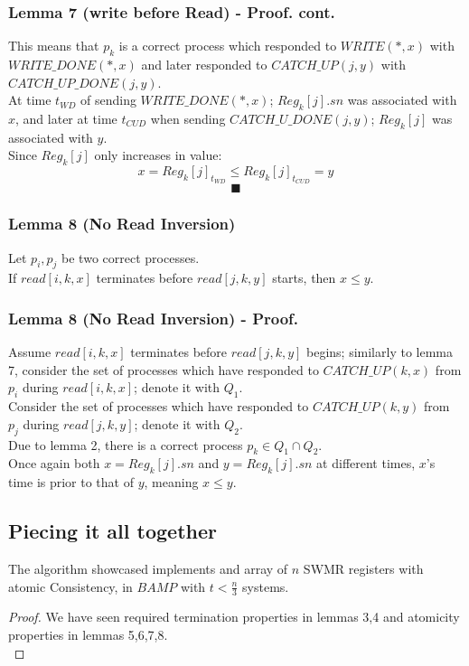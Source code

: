 \begin{frame}
    \frametitle{Lemma 7 (write before Read) - Proof. cont.}
    This means that $p_k$ is a \alert{correct process} which responded to
    $WRITE(*,x)$ with $WRITE\_DONE(*,x)$ and \alert{later} responded to $CATCH\_UP(j,y)$ with
    $CATCH\_UP\_DONE(j,y)$.\\
    At time $t_{WD}$ of sending $WRITE\_DONE(*,x)$; $Reg_k[j].sn$ was associated
    with $x$, and later at time $t_{CUD}$ when sending $CATCH\_U\_DONE(j,y)$; $Reg_k[j]$ was associated
    with $y$.\\
    Since $Reg_k[j]$ only increases in value:
    \[
        x=Reg_k[j]_{t_{WD}}\leq Reg_k[j]_{t_{CUD}}=y    
    \]
    \[\blacksquare \]
\end{frame}

\begin{frame}
    \frametitle{Lemma 8 (No Read Inversion)}
    \begin{lemma}
        Let $p_i, p_j$ be two correct processes.\\
        If $read[i,k,x]$ terminates before $read[j,k,y]$ starts, then $x\leq y$.
    \end{lemma}
\end{frame}
\begin{frame}
    \frametitle{Lemma 8 (No Read Inversion) - Proof.}
    Assume $read[i,k,x]$ terminates before $read[j,k,y]$
    begins; similarly to lemma 7,
    consider the set of processes which have responded to
    $CATCH\_UP(k, x)$ from $p_i$ during $read[i,k,x]$; denote it with $Q_1$.\\
    Consider the set of processes which have responded to
    $CATCH\_UP(k,y)$ from $p_j$ during $read[j,k,y]$; denote it with $Q_2$.\\
    Due to lemma 2, there is a correct process $p_k\in Q_1\cap Q_2$.\\
    Once again both $x=Reg_k[j].sn$ and $y=Reg_k[j].sn$ at different times,
    $x$'s time is prior to that of $y$,
    meaning $x\leq y$.
\end{frame}

\subsection{Piecing it all together}
\begin{frame}
    \begin{theorem}
        The algorithm showcased implements and array of $n$ SWMR
        registers with atomic Consistency, in $BAMP$ with $t<\frac{n}{3}$ systems.
    \end{theorem}
    \begin{proof}
        We have seen required termination properties in lemmas 3,4 and atomicity
        properties in lemmas 5,6,7,8.\\
    \end{proof}
\end{frame}
